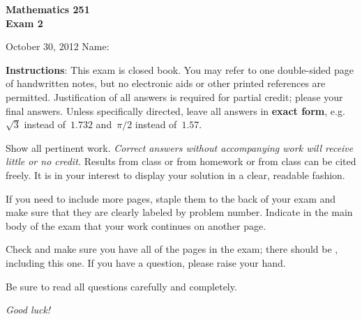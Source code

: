 \documentclass[11pt]{exam}
\begin{document}
\addpoints

\noindent
\textbf{{\large Mathematics 251 \\ Exam 2}}

\noindent
October 30, 2012  \hfill Name: \underline{\hspace{3in}}


\noindent
\textbf{Instructions}: This exam is closed book. You may refer to one double-sided page of handwritten notes, but no electronic aids or other
printed references are permitted. Justification of all answers is required
for partial credit; please  your final answers. Unless
specifically directed, leave all answers in \textbf{exact form}, e.g.\
$\sqrt{3}$ instead of~$1.732$ and~$\pi/2$ instead of~$1.57$.

Show all pertinent work. \emph{Correct answers without accompanying work will receive little or no credit.} Results from class or from homework or from class can be cited freely. It is in your interest to display your solution in a clear, readable fashion.

If you need to include more pages, staple them to the back of your exam and make sure that they are clearly labeled by problem number. Indicate in the main body of the exam that your work continues on another page.

Check and make sure you have all of the pages in the
exam; there should be \numpages, including this one. If you have a
question, please raise your hand.

Be sure to read all questions carefully and completely.

\vspace*{2in}

\begin{center}
\combinedgradetable[h]
\end{center}

\vspace*{0.5in}

\begin{center}
{\Large \emph{Good luck!}}
\end{center}

\newpage
\end{document}
